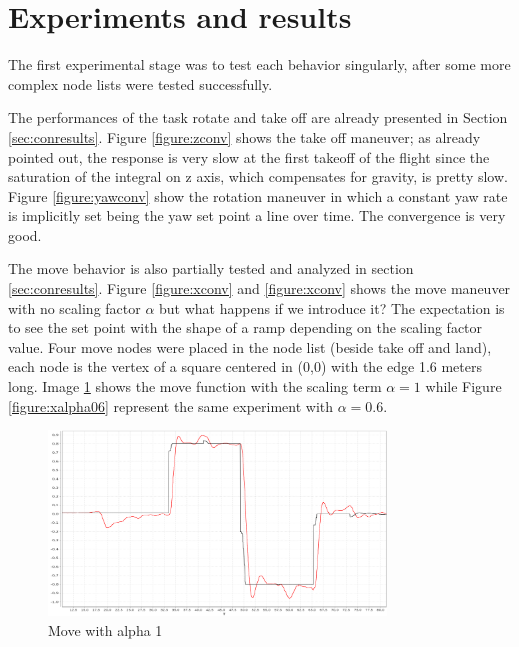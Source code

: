 \section{Experiments and results}

The first experimental stage was to test each behavior singularly, after some more complex node lists were tested successfully. 

The performances of the task rotate and take off are already presented in Section \ref{sec:conresults}. Figure \ref{figure:zconv} shows the take off maneuver; as already pointed out, the response is very slow at the first takeoff of the flight since the saturation of the integral on z axis, which compensates for gravity, is pretty slow. Figure \ref{figure:yawconv} show the rotation maneuver in which a constant yaw rate is implicitly set being the yaw set point a line over time. The convergence is very good. 

The move behavior is also partially tested and analyzed in section \ref{sec:conresults}. Figure \ref{figure:xconv} and \ref{figure:xconv} shows the move maneuver with no scaling factor $\alpha$ but what happens if we introduce it? The expectation is to see the set point with the shape of a ramp depending on the scaling factor value. Four move nodes were placed in the node list (beside take off and land), each node is the vertex of a square centered in (0,0) with the edge 1.6 meters long. Image \ref{figure:xalpha1} shows the move function with the scaling term $\alpha = 1$ while Figure \ref{figure:xalpha06} represent the same experiment with $\alpha = 0.6$. 
\begin{figure}[h]
\centering
 \includegraphics[width=0.8\textwidth]{xalpha1.png}
 \caption{Move with alpha 1}
 \label{figure:xalpha1}
\end{figure}

